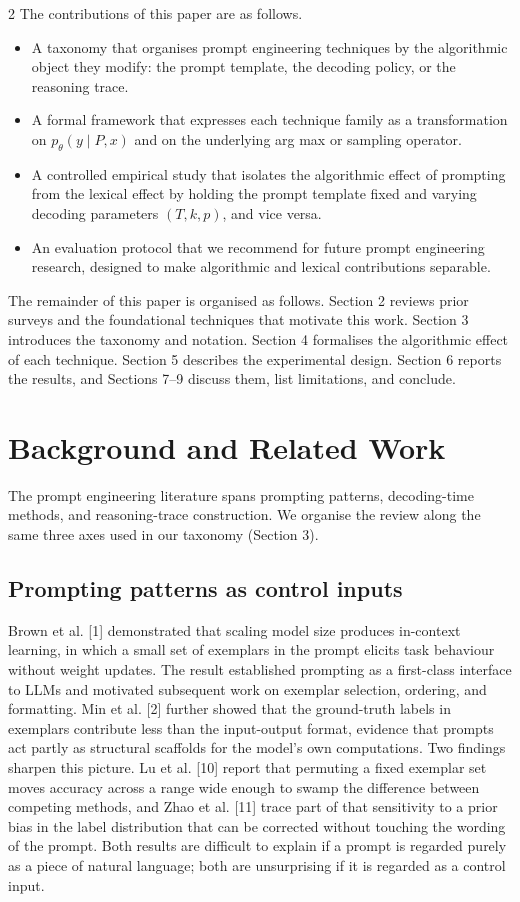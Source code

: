 \documentclass{article}
\begin{document}
\begin{multicols}{2}
The contributions of this paper are as follows.

\begin{itemize}
    \item A taxonomy that organises prompt engineering techniques by the algorithmic object they modify: the prompt template, the decoding policy, or the reasoning trace.
    \item A formal framework that expresses each technique family as a transformation on $p_\theta(y \mid P, x)$ and on the underlying arg max or sampling operator.
    \item A controlled empirical study that isolates the algorithmic effect of prompting from the lexical effect by holding the prompt template fixed and varying decoding parameters $(T, k, p)$, and vice versa.
    \item An evaluation protocol that we recommend for future prompt engineering research, designed to make algorithmic and lexical contributions separable.
\end{itemize}

The remainder of this paper is organised as follows. Section 2 reviews prior surveys and the foundational techniques that motivate this work. Section 3 introduces the taxonomy and notation. Section 4 formalises the algorithmic effect of each technique. Section 5 describes the experimental design. Section 6 reports the results, and Sections 7–9 discuss them, list limitations, and conclude.

\section{Background and Related Work}

The prompt engineering literature spans prompting patterns, decoding-time methods, and reasoning-trace construction. We organise the review along the same three axes used in our taxonomy (Section 3).

\subsection{Prompting patterns as control inputs}

Brown et al. [1] demonstrated that scaling model size produces in-context learning, in which a small set of exemplars in the prompt elicits task behaviour without weight updates. The result established prompting as a first-class interface to LLMs and motivated subsequent work on exemplar selection, ordering, and formatting. Min et al. [2] further showed that the ground-truth labels in exemplars contribute less than the input-output format, evidence that prompts act partly as structural scaffolds for the model's own computations. Two findings sharpen this picture. Lu et al. [10] report that permuting a fixed exemplar set moves accuracy across a range wide enough to swamp the difference between competing methods, and Zhao et al. [11] trace part of that sensitivity to a prior bias in the label distribution that can be corrected without touching the wording of the prompt. Both results are difficult to explain if a prompt is regarded purely as a piece of natural language; both are unsurprising if it is regarded as a control input.


\end{multicols}
\end{document}
